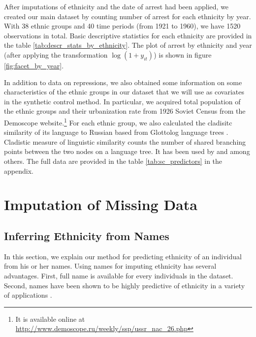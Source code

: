 
After imputations of ethnicity and the date of arrest had been applied,  we created our main dataset by counting number of arrest for each ethnicity by year. %
With 38  ethnic groups  and 40 time periods (from 1921 to 1960), we have 1520 observations in total. Basic descriptive statistics  for each ethnicity are provided in the table \ref{tab:descr_stats_by_ethnicity}.  The plot of arrest by ethnicity and year (after applying the transformation $\log\left(1 + y_{it}\right)$) is shown in figure \ref{fig:facet_by_year}. 

In addition to data on repressions, we also obtained some information on some characteristics of the  ethnic groups in our dataset that we will use as covariates in the synthetic control method. 
In particular, we acquired total population of the ethnic groups and their urbanization rate from 1926 Soviet Census from the Demoscope website.\footnote{It is available online at \url{http://www.demoscope.ru/weekly/ssp/ussr_nac_26.php}} For each ethnic group, we also calculated the cladisitc similarity of its language to Russian based from Glottolog language trees \citep{hammarstrom_glottolog_2018}.
Cladistic measure of linguistic similarity counts the number of shared branching points between the two nodes on a language tree. It has been used by \citet{fearon_ethnic_2003} and \citet{dickens_ethnolinguistic_2018} among others. 
The full data are provided in the table \ref{tab:sc_predictors} in the appendix.


\newpage
\section{Imputation of Missing Data} \label{sec:missing_data}
\subsection{Inferring Ethnicity from Names} \label{subsec:inferring_ethnicity}
In this section, we explain our method for predicting ethnicity of an individual from his or her names. Using names for imputing ethnicity has several advantages. First, full name  is available for every individuals in the dataset. Second, names have been shown to be highly predictive of ethnicity in a variety of applications \citep{mateos_review_2007, hofstra_sources_2017, hofstra_predicting_2018}. 

